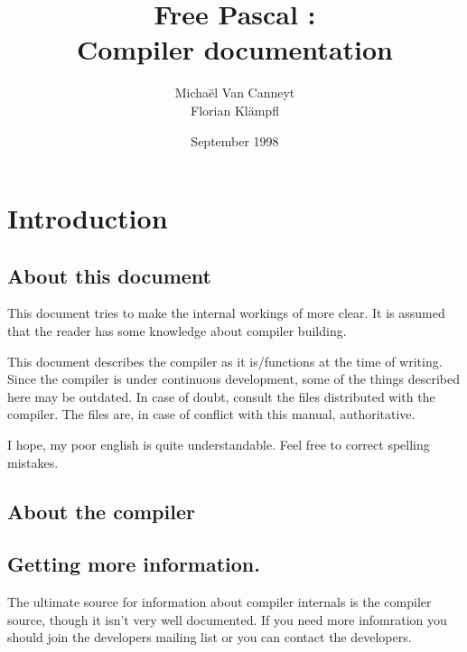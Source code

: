 \documentclass{report}
\begin{document}
\title{Free Pascal :\\ Compiler documentation}
\date{September 1998}
\author{Micha\"el Van Canneyt\\Florian Kl\"ampfl}
\maketitle
\tableofcontents
\chapter{Introduction}

\section{About this document}

This document tries to make the internal workings of \fpc more clear.
It is assumed that the reader has some knowledge about compiler
building.

This document describes the compiler as it is/functions at the time of
writing. Since the compiler is under continuous development, some of the
things described here may be outdated. In case of doubt, consult the
 files distributed with the compiler.
The  files are, in case of conflict with this manual,
 authoritative.

I hope, my poor english is quite understandable. Feel free to correct
spelling mistakes.

\section{About the compiler}

\section{Getting more information.}

The ultimate source for information about compiler internals is
the compiler source, though it isn't very well documented. If you
need more infomration you should join the developers mailing
list or you can contact the developers.
\end{document}
